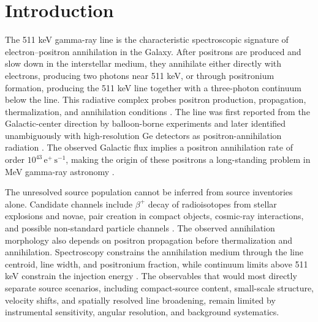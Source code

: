 \documentclass[preprint,12pt]{elsarticle}
\begin{document}

\section{Introduction}
\label{sec:intro}

The 511 keV gamma-ray line is the characteristic spectroscopic signature of electron--positron annihilation in the Galaxy. After positrons are produced and slow down in the interstellar medium, they annihilate either directly with electrons, producing two photons near 511 keV, or through positronium formation, producing the 511 keV line together with a three-photon continuum below the line. This radiative complex probes positron production, propagation, thermalization, and annihilation conditions \cite{Prantzos2011,Jean2006}. The line was first reported from the Galactic-center direction by balloon-borne experiments and later identified unambiguously with high-resolution Ge detectors as positron-annihilation radiation \cite{Prantzos2011}. The observed Galactic flux implies a positron annihilation rate of order $10^{43}\,\mathrm{e^+\,s^{-1}}$, making the origin of these positrons a long-standing problem in MeV gamma-ray astronomy \cite{Prantzos2011,Kierans2020}.

The unresolved source population cannot be inferred from source inventories alone. Candidate channels include $\beta^+$ decay of radioisotopes from stellar explosions and novae, pair creation in compact objects, cosmic-ray interactions, and possible non-standard particle channels \cite{Prantzos2011,Siegert2016AA,Yoneda2025}. The observed annihilation morphology also depends on positron propagation before thermalization and annihilation. Spectroscopy constrains the annihilation medium through the line centroid, line width, and positronium fraction, while continuum limits above 511 keV constrain the injection energy \cite{Prantzos2011,Jean2006,Siegert2019Kinematics}. The observables that would most directly separate source scenarios, including compact-source content, small-scale structure, velocity shifts, and spatially resolved line broadening, remain limited by instrumental sensitivity, angular resolution, and background systematics.
\end{document}

